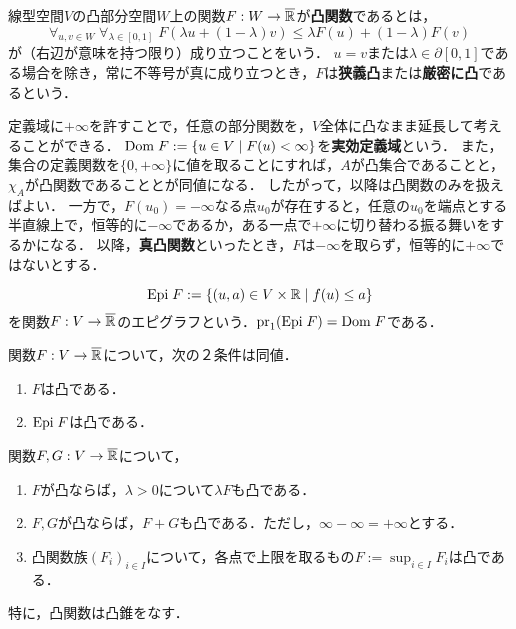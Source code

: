 \documentclass[uplatex,dvipdfmx]{jsreport}
\begin{document}
\begin{definition}
    線型空間$V$の凸部分空間$W$上の関数$F:W\to\overline{\mathbb{R}}$が\textbf{凸関数}であるとは，
    \[\forall_{u,v\in W}\;\forall_{\lambda\in[0,1]}\;F(\lambda u+(1-\lambda)v)\le\lambda F(u)+(1-\lambda)F(v)\]
    が（右辺が意味を持つ限り）成り立つことをいう．
    $u=v$または$\lambda\in\partial[0,1]$である場合を除き，常に不等号が真に成り立つとき，$F$は\textbf{狭義凸}または\textbf{厳密に凸}であるという．
\end{definition}
\begin{remarks}
    定義域に$+\infty$を許すことで，任意の部分関数を，$V$全体に凸なまま延長して考えることができる．
    $\mathrm{Dom}\; F:=\left\{u\in V\mid F(u)<\infty\right\}$を\textbf{実効定義域}という．
    また，集合の定義関数を$\{0,+\infty\}$に値を取ることにすれば，$A$が凸集合であることと，$\chi_A$が凸関数であることとが同値になる．
    したがって，以降は凸関数のみを扱えばよい．
    一方で，$F(u_0)=-\infty$なる点$u_0$が存在すると，任意の$u_0$を端点とする半直線上で，恒等的に$-\infty$であるか，ある一点で$+\infty$に切り替わる振る舞いをするかになる．
    以降，\textbf{真凸関数}といったとき，$F$は$-\infty$を取らず，恒等的に$+\infty$ではないとする．
\end{remarks}

\begin{definition}[epigraph]
    \[\mathrm{Epi}\; F:=\left\{(u,a)\in V\times\mathbb{R}\mid f(u)\le a\right\}\]
    を関数$F:V\to\overline{\mathbb{R}}$のエピグラフという．$\mathrm{pr}_1(\mathrm{Epi}\; F)=\mathrm{Dom}\; F$である．
\end{definition}

\begin{proposition}[凸関数の特徴付け]
    関数$F:V\to\overline{\mathbb{R}}$について，次の２条件は同値．
    \begin{enumerate}
        \item $F$は凸である．
        \item $\mathrm{Epi}\; F$は凸である．
    \end{enumerate}
\end{proposition}

\begin{proposition}[凸関数の凸錐]
    関数$F,G:V\to\overline{\mathbb{R}}$について，
    \begin{enumerate}
        \item $F$が凸ならば，$\lambda>0$について$\lambda F$も凸である．
        \item $F,G$が凸ならば，$F+G$も凸である．ただし，$\infty-\infty=+\infty$とする．
        \item 凸関数族$(F_i)_{i\in I}$について，各点で上限を取るもの$F:=\sup_{i\in I}F_i$は凸である．
    \end{enumerate}
    特に，凸関数は凸錐をなす．
\end{proposition}
\end{document}
